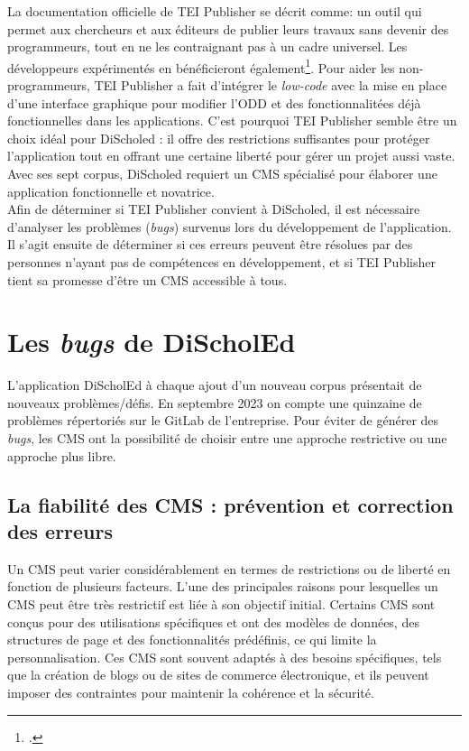 La documentation officielle de TEI Publisher se décrit comme: \og{}un outil qui permet aux chercheurs et aux éditeurs de publier leurs travaux sans devenir des programmeurs, tout en ne les contraignant pas à un cadre universel. Les développeurs expérimentés en bénéficieront également\fg{}\footcite{TEIPublisher}. Pour aider les non-programmeurs, TEI Publisher a fait d'intégrer le \textit{low-code} avec la mise en place d'une interface graphique pour modifier l'ODD et des fonctionnalitées déjà fonctionnelles dans les applications.
C'est pourquoi TEI Publisher semble être un choix idéal pour DiScholed : il offre des restrictions suffisantes pour protéger l'application tout en offrant une certaine liberté pour gérer un projet aussi vaste. Avec ses sept corpus, DiScholed requiert un CMS spécialisé pour élaborer une application fonctionnelle et novatrice. \\

Afin de déterminer si TEI Publisher convient à DiScholed, il est nécessaire d'analyser les problèmes (\textit{bugs}) survenus lors du développement de l'application. Il s'agit ensuite de déterminer si ces erreurs peuvent être résolues par des personnes n'ayant pas de compétences en développement, et si TEI Publisher tient sa promesse d'être un CMS accessible à tous.

\chapter{Les \textit{bugs} de DiScholEd}

L'application DiScholEd à chaque ajout d'un nouveau corpus présentait de nouveaux problèmes/défis. En septembre 2023 on compte une quinzaine de problèmes répertoriés sur le GitLab de l'entreprise. 
Pour éviter de générer des \textit{bugs}, les CMS ont la possibilité de choisir entre une approche restrictive ou une approche plus libre.

\section{La fiabilité des CMS : prévention et correction des erreurs}

Un CMS peut varier considérablement en termes de restrictions ou de liberté en fonction de plusieurs facteurs. L'une des principales raisons pour lesquelles un CMS peut être très restrictif est liée à son objectif initial. Certains CMS sont conçus pour des utilisations spécifiques et ont des modèles de données, des structures de page et des fonctionnalités prédéfinis, ce qui limite la personnalisation. Ces CMS sont souvent adaptés à des besoins spécifiques, tels que la création de blogs ou de sites de commerce électronique, et ils peuvent imposer des contraintes pour maintenir la cohérence et la sécurité.

